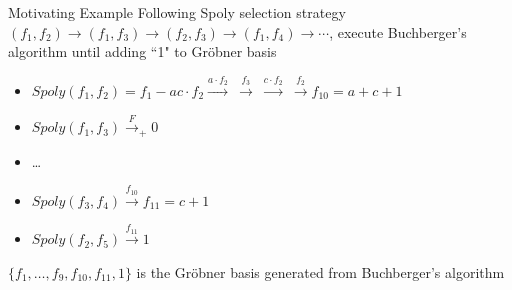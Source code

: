 \documentclass[xcolor=dvipsnames]{beamer}
\newcommand{\bi}{\begin{itemize}}
\newcommand{\ei}{\end{itemize}}
\begin{document}
\begin{frame}{\large{Motivating Example}}
Following Spoly selection strategy $(f_1,f_2)\to (f_1,f_3) \to (f_2,f_3)\to (f_1,f_4) \to \cdots$,
execute Buchberger's algorithm until adding ``1" to Gr\"obner basis
\bi
\item $Spoly(f_1,f_2)= f_1 - ac\cdot f_2\xrightarrow{a\cdot f_2} ~\xrightarrow{f_3}~
\xrightarrow{c\cdot f_2}  ~\xrightarrow{f_2} f_{10}=a+c+1$
\item $Spoly(f_1,f_3)\xrightarrow{F}_+ 0$
\item \dots
\item $Spoly(f_3,f_4)\xrightarrow{f_{10}} f_{11} = c+1$
\item $Spoly(f_2,f_5)\xrightarrow{f_{11}} 1$
\ei
$\{f_1,\dots,f_9,f_{10},f_{11},1\}$ is the Gr\"obner basis generated from Buchberger's algorithm
\end{frame}

\end{document}
